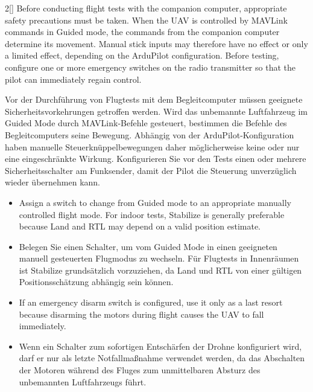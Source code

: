\begin{paracol}{2}[]
Before conducting flight tests with the companion computer, appropriate safety precautions must be taken. When the UAV is controlled by MAVLink commands in Guided mode, the commands from the companion computer determine its movement. Manual stick inputs may therefore have no effect or only a limited effect, depending on the ArduPilot configuration. Before testing, configure one or more emergency switches on the radio transmitter so that the pilot can immediately regain control.

\colger

Vor der Durchführung von Flugtests mit dem Begleitcomputer müssen geeignete Sicherheitsvorkehrungen getroffen werden. Wird das unbemannte Luftfahrzeug im Guided Mode durch MAVLink-Befehle gesteuert, bestimmen die Befehle des Begleitcomputers seine Bewegung. Abhängig von der ArduPilot-Konfiguration haben manuelle Steuerknüppelbewegungen daher möglicherweise keine oder nur eine eingeschränkte Wirkung. Konfigurieren Sie vor den Tests einen oder mehrere Sicherheitsschalter am Funksender, damit der Pilot die Steuerung unverzüglich wieder übernehmen kann.

\coleng

\begin{itemize}
  \item Assign a switch to change from Guided mode to an appropriate manually controlled flight mode. For indoor tests, Stabilize is generally preferable because Land and RTL may depend on a valid position estimate.
\end{itemize}

\colger

\begin{itemize}
  \item Belegen Sie einen Schalter, um vom Guided Mode in einen geeigneten manuell gesteuerten Flugmodus zu wechseln. Für Flugtests in Innenräumen ist Stabilize grundsätzlich vorzuziehen, da Land und RTL von einer gültigen Positionsschätzung abhängig sein können.
\end{itemize}

\coleng

\begin{itemize}
  \item If an emergency disarm switch is configured, use it only as a last resort because disarming the motors during flight causes the UAV to fall immediately.
\end{itemize}

\colger

\begin{itemize}
  \item Wenn ein Schalter zum sofortigen Entschärfen der Drohne konfiguriert wird, darf er nur als letzte Notfallmaßnahme verwendet werden, da das Abschalten der Motoren während des Fluges zum unmittelbaren Absturz des unbemannten Luftfahrzeugs führt.
\end{itemize}


\end{paracol}
